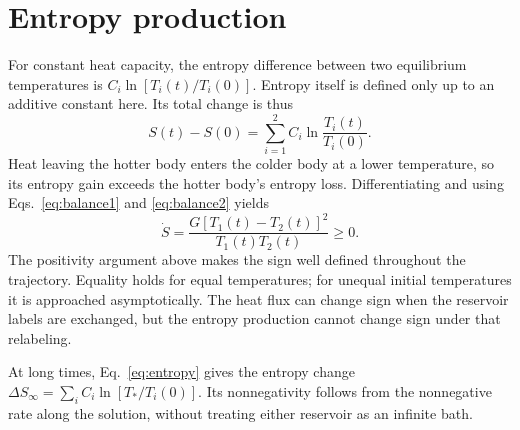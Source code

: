 \section{Entropy production}
For constant heat capacity, the entropy difference between two equilibrium temperatures is $C_i\ln[T_i(t)/T_i(0)]$. Entropy itself is defined only up to an additive constant here. Its total change is thus
\begin{equation}
 S(t)-S(0)=\sum_{i=1}^{2} C_i\ln\frac{T_i(t)}{T_i(0)}.\label{eq:entropy}
\end{equation}
Heat leaving the hotter body enters the colder body at a lower temperature, so its entropy gain exceeds the hotter body's entropy loss. Differentiating and using Eqs.~\eqref{eq:balance1} and \eqref{eq:balance2} yields
\begin{equation}
 \dot S=\frac{G[T_1(t)-T_2(t)]^2}{T_1(t)T_2(t)}\geq0.\label{eq:srate}
\end{equation}
The positivity argument above makes the sign well defined throughout the trajectory. Equality holds for equal temperatures; for unequal initial temperatures it is approached asymptotically. The heat flux can change sign when the reservoir labels are exchanged, but the entropy production cannot change sign under that relabeling.

At long times, Eq.~\eqref{eq:entropy} gives the entropy change $\Delta S_\infty=\sum_i C_i\ln[T_*/T_i(0)]$. Its nonnegativity follows from the nonnegative rate along the solution, without treating either reservoir as an infinite bath.
